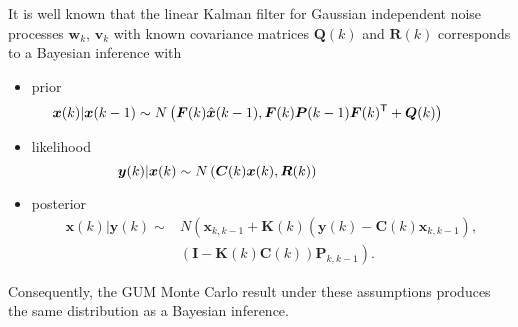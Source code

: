 \documentclass[10pt]{article}
\begin{document}
\begin{spacing}{1}
It is well known that the linear Kalman filter for Gaussian independent noise processes $\bm{w}_k$, $\bm{v}_k$ with known covariance matrices $\bm{Q}(k)$ and $\bm{R}(k)$ corresponds to a Bayesian inference \cite{Candy} with 
\begin{itemize}
 \item prior
 \begin{equation}
\hspace{-8ex}	\bm{x}(k) \vert \bm{x}(k-1) \sim N\left( \bm{F}(k)\hat{\bm{x}}(k-1), \bm{F}(k)\bm{P}(k-1)\bm{F}(k)^{\mathsf{T}}+\bm{Q}(k) \right)	
 \end{equation}
 \item likelihood
 \begin{equation}
\hspace{-18ex}	\bm{y}(k) \vert \bm{x}(k) \sim N\left( \bm{C}(k) \bm{x}(k), \bm{R}(k) \right)
 \end{equation}
 \item posterior
  \begin{align}
  	\bm{x}(k) \vert \bm{y}(k) \sim	& N\left( \bm{x}_{k,k-1}+\bm{K}(k)(\bm{y}(k)-\bm{C}(k)\bm{x}_{k,k-1}), \right. \nonumber\\ 
  			&\left. \left( \bm{I} - \bm{K}(k)\bm{C}(k) \right)\bm{P}_{k,k-1} \right) .
  \end{align}
\end{itemize}

Consequently, the GUM Monte Carlo result under these assumptions produces the same distribution as a Bayesian inference.


\end{spacing}
\end{document}
